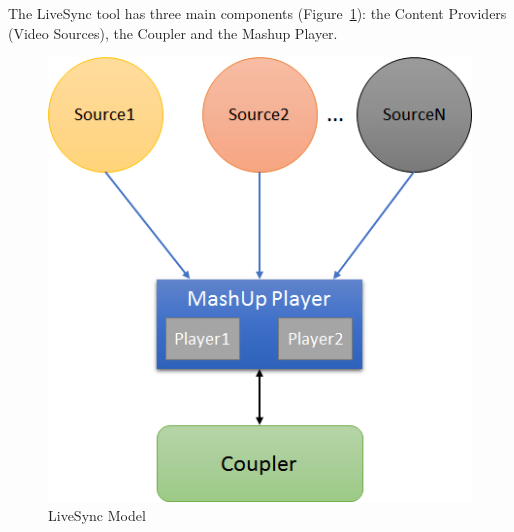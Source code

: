 

The LiveSync tool has three main components (Figure~\ref{live_arq}): the Content Providers (Video Sources), the Coupler and the Mashup Player.

\begin{figure}[h]
	\centerline{\includegraphics[scale=0.6] {figure/arqchitecture}}
	\caption{LiveSync Model}
	\label{live_arq}
\end{figure}


